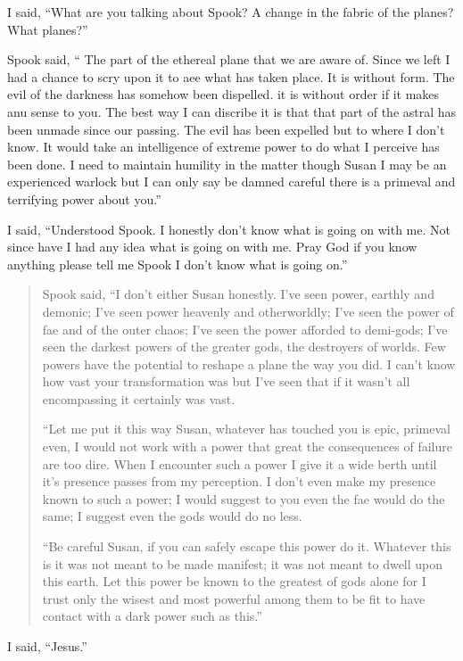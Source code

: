 I said, ``What are you talking about Spook? A change in the fabric of the planes? What planes?''

Spook said, `` The part of the ethereal plane that we are aware of. Since we left I had a chance to scry upon it to aee what has taken place. It is without form. The evil of the darkness has somehow been dispelled. it is without order if it makes anu sense to you. The best way I can discribe it is that that part of the astral has been unmade since our passing. The evil has been expelled but to where I don't know. It would take an intelligence of extreme power to do what I perceive has been done. I need to maintain humility in the matter though Susan I may be an experienced warlock but I can only say be damned careful there is a primeval and terrifying power about you.''

I said, ``Understood Spook. I honestly don't know what is going on with me. Not since \chichenitza* have I had any idea what is going on with me. Pray God if you know anything please tell me Spook I don't know what is going on.''

\begin{quote}
	Spook said, ``I don't either Susan honestly. I've seen power, earthly and demonic; I've seen power heavenly and otherworldly; I've seen the power of fae and of the outer chaos; I've seen the power afforded to demi-gods; I've seen the darkest powers of the greater gods, the destroyers of worlds. Few powers have the potential to reshape a plane the way you did. I can't know how vast your transformation was but I've seen that if it wasn't all encompassing it certainly was vast.

	``Let me put it this way Susan, whatever has touched you is epic, primeval even, I would not work with a power that great the consequences of failure are too dire. When I encounter such a power I give it a wide berth until it's presence passes from my perception. I don't even make my presence known to such a power; I would suggest to you even the fae would do the same; I suggest even the gods would do no less.

	``Be careful Susan, if you can safely escape this power do it. Whatever this is it was not meant to be made manifest; it was not meant to dwell upon this earth. Let this power be known to the greatest of gods alone for I trust only the wisest and most powerful among them to be fit to have contact with a dark power such as this.''
\end{quote}

I said, ``Jesus.''

